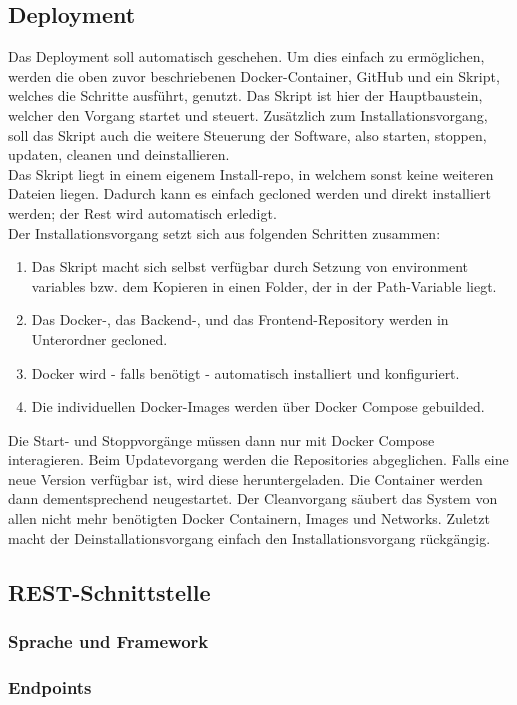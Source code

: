 	\subsection{Deployment}
	Das Deployment soll automatisch geschehen. Um dies einfach zu ermöglichen, werden die oben zuvor beschriebenen Docker-Container, GitHub und ein Skript, welches die Schritte ausführt, genutzt. Das Skript ist hier der Hauptbaustein, welcher den Vorgang startet und steuert. Zusätzlich zum Installationsvorgang, soll das Skript auch die weitere Steuerung der Software, also starten, stoppen, updaten, cleanen und deinstallieren.~\\
	Das Skript liegt in einem eigenem Install-\Gls{repo}, in welchem sonst keine weiteren Dateien liegen. Dadurch kann es einfach gecloned werden und direkt installiert werden; der Rest wird automatisch erledigt.~\\
	Der Installationsvorgang setzt sich aus folgenden Schritten zusammen:
	\begin{enumerate}
		\item Das Skript macht sich selbst verfügbar durch Setzung von environment variables bzw. dem Kopieren in einen Folder, der in der Path-Variable liegt.
		\item Das Docker-, das Backend-, und das Frontend-Repository werden in Unterordner gecloned.
		\item Docker wird - falls benötigt - automatisch installiert und konfiguriert.
		\item Die individuellen Docker-Images werden über Docker Compose gebuilded.
	\end{enumerate}
	Die Start- und Stoppvorgänge müssen dann nur mit Docker Compose interagieren. Beim Updatevorgang werden die Repositories abgeglichen. Falls eine neue Version verfügbar ist, wird diese heruntergeladen. Die Container werden dann dementsprechend neugestartet. Der Cleanvorgang säubert das System von allen nicht mehr benötigten Docker Containern, Images und Networks. Zuletzt macht der Deinstallationsvorgang einfach den Installationsvorgang rückgängig.
	\subsection{REST-Schnittstelle}
		\subsubsection{Sprache und Framework}
		\subsubsection{Endpoints}
